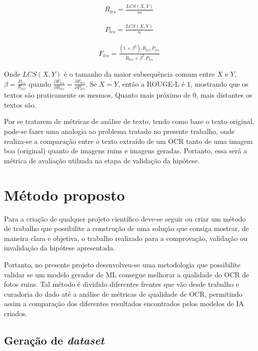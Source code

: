 \begin{gather}
  R_{lcs} = \frac{LCS(X, Y)}{m}
\end{gather}

\begin{gather}
  P_{lcs} = \frac{LCS(X, Y)}{n}
\end{gather}

\begin{gather}
  F_{lcs} = \frac{(1 + \beta^2).R_{lcs} . P_{lcs}}{R_{lcs} + \beta^2.P_{lcs} }
\end{gather}

Onde \(LCS(X, Y)\) é o tamanho da maior subsequência comum entre $X$ e $Y$, \(\beta = \frac{P_{lcs}}{R_{lcs}}\) quando \(\frac{\partial F_{lcs}}{\partial R_{lcs}} = \frac{\partial F_{lcs}}{\partial P_{lcs}}\). Se \(X = Y\), então a ROUGE-L é 1, mostrando que os textos são praticamente os mesmos. Quanto mais próximo de 0, mais distantes os textos são.

\ornament

Por se tratarem de métricas de análise de texto, tendo como base o texto original, pode-se fazer uma analogia ao problema tratado no presente trabalho, onde realiza-se a comparação entre o texto extraído de um OCR tanto de uma imagem boa (original) quanto de imagens ruins e imagens geradas. Portanto, essa será a métrica de avaliação utilzada na etapa de validação da hipótese.

\section{Método proposto}

Para a criação de qualquer projeto científico deve-se seguir ou criar um método de trabalho que possibilite a construção de uma solução que consiga mostrar, de maneira clara e objetiva, o trabalho realizado para a comprovação, validação ou invalidação da hipótese apresentada.

Portanto, no presente projeto desenvolveu-se uma metodologia que possibilite validar se um modelo gerador de ML consegue melhorar a qualidade do OCR de fotos ruins. Tal método é dividido diferentes frentes que vão desde trabalho e curadoria do dado até a análise de métricas de qualidade de OCR, permitindo assim a comparação dos diferentes resultados encontrados pelos modelos de IA criados.

\subsection{Geração de \textit{dataset}}

